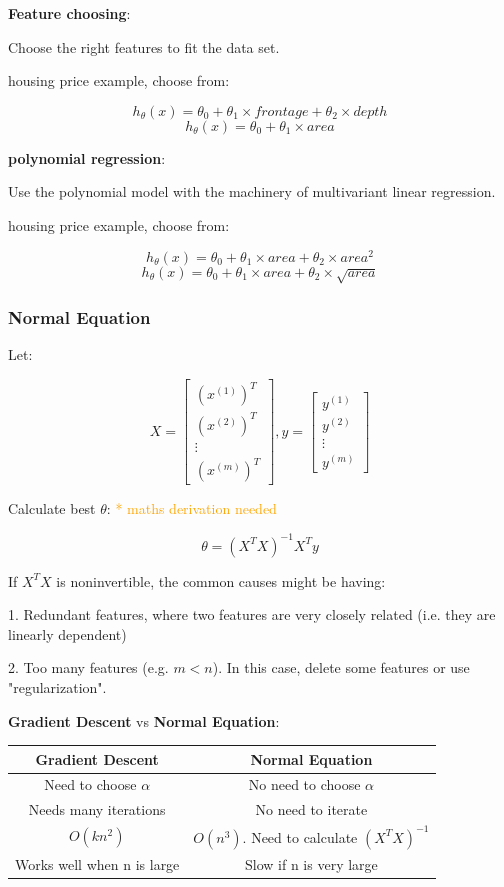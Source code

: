 \documentclass{article}
\begin{document}
\textbf{Feature choosing}:

Choose the right features to fit the data set.

housing price example, choose from:

\[h_{\theta}(x) = \theta_0 + \theta_1 \times frontage + \theta_2 \times depth\]
\[h_{\theta}(x) = \theta_0 + \theta_1 \times area\]

\textbf{polynomial regression}:

Use the polynomial model with the machinery of multivariant linear regression.

housing price example, choose from:

\[h_{\theta}(x) = \theta_0 + \theta_1 \times area + \theta_2 \times area^2\]
\[h_{\theta}(x) = \theta_0 + \theta_1 \times area + \theta_2 \times \sqrt{area}\]

\subsubsection{Normal Equation}

Let:

\[
X = 
\begin{bmatrix}
(x^{(1)})^T\\
(x^{(2)})^T\\
\vdots\\
(x^{(m)})^T
\end{bmatrix}
,
y = 
\begin{bmatrix}
y^{(1)}\\
y^{(2)}\\
\vdots\\
y^{(m)}
\end{bmatrix}
\]

Calculate best \(\theta\): \textcolor{orange}{ * maths derivation needed}

\[
\theta = (X^TX)^{-1}X^Ty
\]

If \(X^TX\) is noninvertible, the common causes might be having:

1. Redundant features, where two features are very closely related (i.e. they are linearly dependent)

2. Too many features (e.g. \(m < n\)). In this case, delete some features or use "regularization".

\textbf{Gradient Descent} vs \textbf{Normal Equation}:

\begin{center}
\begin{tabular}{ | c | c | } 
\hline
\textbf{Gradient Descent} & \textbf{Normal Equation} \\ 
\hline
Need to choose \(\alpha\) & No need to choose \(\alpha\) \\ 
\hline
Needs many iterations & No need to iterate \\ 
\hline
\(O(kn^2)\) & \(O(n^3)\). Need to calculate \((X^TX)^{-1}\) \\ 
\hline
Works well when n is large & Slow if n is very large \\ 
\hline
\end{tabular}
\end{center}
\end{document}
